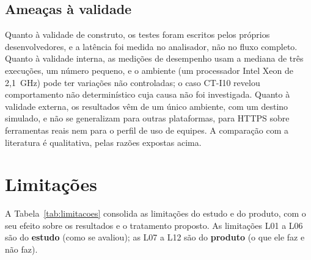 \subsection{Ameaças à validade}

Quanto à validade de construto, os testes foram escritos pelos próprios desenvolvedores, e a latência foi medida no analisador, não no fluxo completo. Quanto à validade interna, as medições de desempenho usam a mediana de três execuções, um número pequeno, e o ambiente (um processador Intel Xeon de 2,1~GHz) pode ter variações não controladas; o caso CT-I10 revelou comportamento não determinístico cuja causa não foi investigada. Quanto à validade externa, os resultados vêm de um único ambiente, com um destino simulado, e não se generalizam para outras plataformas, para HTTPS sobre ferramentas reais nem para o perfil de uso de equipes. A comparação com a literatura é qualitativa, pelas razões expostas acima.

\section{Limitações}
\label{sec:res_limitacoes}

A Tabela~\ref{tab:limitacoes} consolida as limitações do estudo e do produto, com o seu efeito sobre os resultados e o tratamento proposto. As limitações L01 a L06 são do \textbf{estudo} (como se avaliou); as L07 a L12 são do \textbf{produto} (o que ele faz e não faz).

